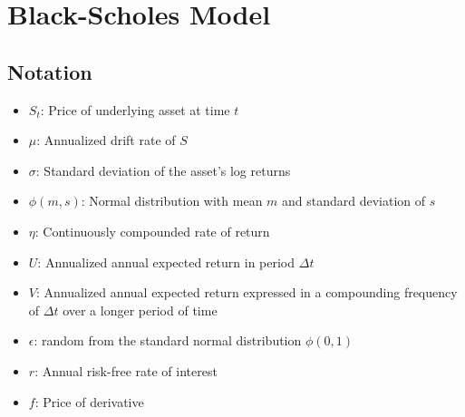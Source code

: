 \documentclass{article}
\begin{document}
\section{Black-Scholes Model}
\subsection{Notation}
\begin{itemize}
    \item $S_{t}$: Price of underlying asset at time $t$
    \item $\mu$: Annualized drift rate of $S$
    \item $\sigma$: Standard deviation of the asset's log returns
    \item $\phi (m,s)$: Normal distribution with mean $m$ and standard deviation of $s$
    \item $\eta$: Continuously compounded rate of return
    \item $U$: Annualized annual expected return in period $\Delta t$
    \item $V$: Annualized annual expected return expressed in a compounding frequency of $\Delta t$ over a longer period of time
    \item $\epsilon$: random from the standard normal distribution $\phi(0, 1)$
    \item $r$: Annual risk-free rate of interest
    \item $f$: Price of derivative
\end{itemize}
\end{document}
